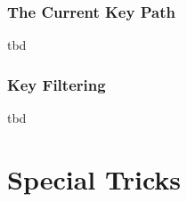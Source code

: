 \documentclass[a4paper]{ltxdoc}
\begin{document}
\subsubsection{The Current Key Path}
tbd

\subsubsection{Key Filtering}
tbd

\endgroup







\section{Special Tricks}
\end{document}
